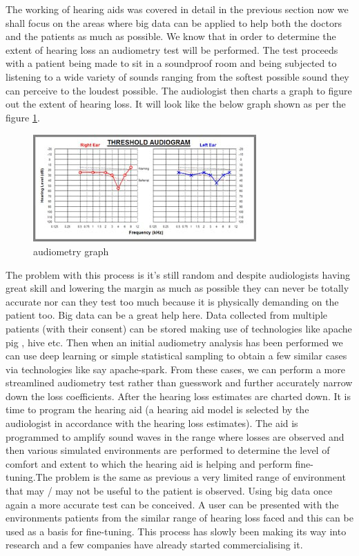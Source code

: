 \documentclass[sigconf]{acmart}
\begin{document}
The working of hearing aids was covered in detail in the previous section now we shall focus on the areas where big data can be applied to help both the doctors and the patients as much as possible. We know that in order to determine the extent of hearing loss an audiometry test will be performed. The test proceeds with a patient being made to sit in a soundproof room and being subjected to listening to a wide variety of sounds ranging from the softest possible sound they can perceive to the loudest possible. The audiologist then charts a graph to figure out the extent of hearing loss. It will look like the below graph shown as per the figure  \ref{f:audiometrygraph}.
\begin{figure}[!ht]
  \centering\includegraphics[width=\columnwidth]{images/audiometerygraph.jpg}
  \caption{audiometry graph}\label{f:audiometrygraph}
\end{figure}  
The problem with this process is it's still random and despite audiologists having great skill and lowering the margin as much as possible they can never be totally accurate nor can they test too much because it is physically demanding on the patient too. Big data can be a great help here. Data collected from multiple patients (with their consent) can be stored making use of technologies like apache pig , hive etc. Then when an initial audiometry analysis has been performed we can use deep learning or simple statistical sampling to obtain a few similar cases via technologies like say apache-spark. From these cases, we can perform a more streamlined audiometry test rather than guesswork and further accurately narrow down the loss coefficients. 
\newline
After the hearing loss estimates are charted down. It is time to program the hearing aid (a hearing aid model is selected by the audiologist in accordance with the hearing loss estimates). The aid is programmed to amplify sound waves in the range where losses are observed and then various simulated environments are performed to determine the level of comfort and extent to which the hearing aid is helping and perform fine-tuning.The problem is the same as previous a very limited range of environment that may / may not be useful to the patient is observed. Using big data once again a more accurate test can be conceived. A user can be presented with the environments patients from the similar range of hearing loss faced and this can be used as a basis for fine-tuning. This process has slowly been making its way into research \cite{peternordquist2017} and a few companies \cite{phonak2017} have already started commercialising it.
\end{document}
